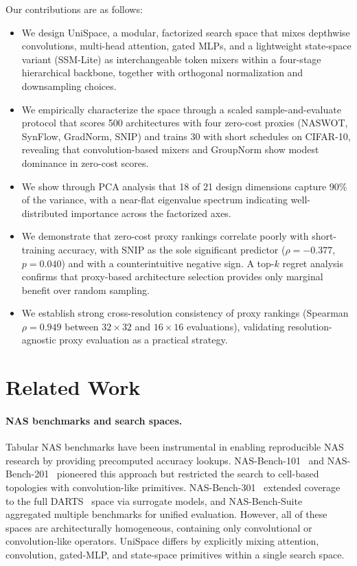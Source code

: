 \documentclass[10pt,twocolumn,letterpaper]{article}
\newcommand{\method}{UniSpace\xspace}
\newcommand{\naswot}{NASWOT\xspace}
\begin{document}
Our contributions are as follows:
\begin{itemize}[leftmargin=*,nosep]
    \item We design \method, a modular, factorized search space that mixes depthwise convolutions, multi-head attention, gated MLPs, and a lightweight state-space variant (SSM-Lite) as interchangeable token mixers within a four-stage hierarchical backbone, together with orthogonal normalization and downsampling choices.
    \item We empirically characterize the space through a scaled sample-and-evaluate protocol that scores 500 architectures with four zero-cost proxies (\naswot, SynFlow, GradNorm, SNIP) and trains 30 with short schedules on CIFAR-10, revealing that convolution-based mixers and GroupNorm show modest dominance in zero-cost scores.
    \item We show through PCA analysis that 18 of 21 design dimensions capture 90\% of the variance, with a near-flat eigenvalue spectrum indicating well-distributed importance across the factorized axes.
    \item We demonstrate that zero-cost proxy rankings correlate poorly with short-training accuracy, with SNIP as the sole significant predictor ($\rho = -0.377$, $p = 0.040$) and with a counterintuitive negative sign. A top-$k$ regret analysis confirms that proxy-based architecture selection provides only marginal benefit over random sampling.
    \item We establish strong cross-resolution consistency of proxy rankings (Spearman $\rho = 0.949$ between $32 \times 32$ and $16 \times 16$ evaluations), validating resolution-agnostic proxy evaluation as a practical strategy.
\end{itemize}

\section{Related Work}
\label{sec:related}

\paragraph{NAS benchmarks and search spaces.}
Tabular NAS benchmarks have been instrumental in enabling reproducible NAS research by providing precomputed accuracy lookups. 
NAS-Bench-101~\cite{ying2019nasbench101} and NAS-Bench-201~\cite{dong2020nasbench201} pioneered this approach but restricted the search to cell-based topologies with convolution-like primitives. 
NAS-Bench-301~\cite{zela2022nasbench301} extended coverage to the full DARTS~\cite{liu2019darts} space via surrogate models, and NAS-Bench-Suite~\cite{mehta2022nasbenchsuite} aggregated multiple benchmarks for unified evaluation. 
However, all of these spaces are architecturally homogeneous, containing only convolutional or convolution-like operators. 
\method differs by explicitly mixing attention, convolution, gated-MLP, and state-space primitives within a single search space.
\end{document}
